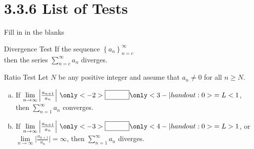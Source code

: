\section{3.3.6 List of Tests}

\begin{frame}[t]{Fill in in the blanks}
\begin{block}{Divergence Test}
If the sequence $\left\{ a_n\right\}_{n=c}^\infty$ \\
 then the series $\sum\limits_{n=c}^\infty a_n$ diverges.
\end{block}\vfill

\begin{block}{Ratio Test}
Let $N$ be any positive integer and assume that $a_n\ne 0$ for all $n\ge N$.
\begin{enumerate}[(a)]
\item If $\lim\limits_{n\rightarrow\infty}\Big|\frac{a_{n+1}}{a_n}\Big| ~\only<-2>{\boxed{\vphantom{A}\hspace{1cm}}} \only<3-|handout:0>{=L<1}$,
then $\sum\limits_{n=1}^\infty a_n$ converges.
\item If $\lim\limits_{n\rightarrow\infty}\Big|\frac{a_{n+1}}{a_n}\Big| 
~\only<-3>{\boxed{\vphantom{A}\hspace{1cm}}} \only<4-|handout:0>{=L>1}$,
or $\lim\limits_{n\rightarrow\infty}\Big|\frac{a_{n+1}}{a_n}\Big| = \infty$,
then $\sum\limits_{n=1}^\infty a_n$ diverges.
\end{enumerate}
\end{block}

\end{frame}
